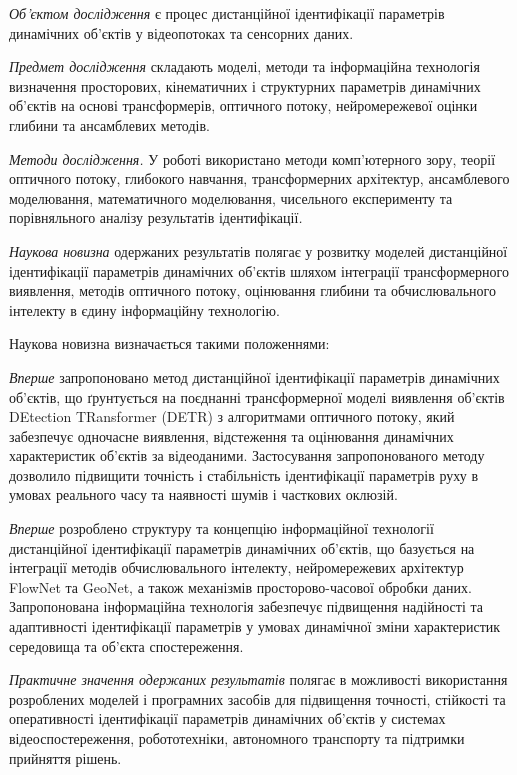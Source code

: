 \documentclass[
]{article}
\begin{document}
\emph{Об'єктом дослідження} є процес дистанційної ідентифікації параметрів динамічних об'єктів у відеопотоках та сенсорних даних.

\emph{Предмет дослідження} складають моделі, методи та інформаційна технологія визначення просторових, кінематичних і структурних параметрів динамічних об'єктів на основі трансформерів, оптичного потоку, нейромережевої оцінки глибини та ансамблевих методів.

\emph{Методи дослідження.} У роботі використано методи комп'ютерного зору, теорії оптичного потоку, глибокого навчання, трансформерних архітектур, ансамблевого моделювання, математичного моделювання, чисельного експерименту та порівняльного аналізу результатів ідентифікації\emph{.}

\emph{Наукова новизна} одержаних результатів полягає у розвитку моделей дистанційної ідентифікації параметрів динамічних об'єктів шляхом інтеграції трансформерного виявлення, методів оптичного потоку, оцінювання глибини та обчислювального інтелекту в єдину інформаційну технологію.

Наукова новизна визначається такими положеннями:

\emph{Вперше} запропоновано метод дистанційної ідентифікації параметрів динамічних об'єктів, що ґрунтується на поєднанні трансформерної моделі виявлення об'єктів DEtection TRansformer (DETR) з алгоритмами оптичного потоку, який забезпечує одночасне виявлення, відстеження та оцінювання динамічних характеристик об'єктів за відеоданими. Застосування запропонованого методу дозволило підвищити точність і стабільність ідентифікації параметрів руху в умовах реального часу та наявності шумів і часткових оклюзій.

\emph{Вперше} розроблено структуру та концепцію інформаційної технології дистанційної ідентифікації параметрів динамічних об'єктів, що базується на інтеграції методів обчислювального інтелекту, нейромережевих архітектур FlowNet та GeoNet, а також механізмів просторово-часової обробки даних. Запропонована інформаційна технологія забезпечує підвищення надійності та адаптивності ідентифікації параметрів у умовах динамічної зміни характеристик середовища та об'єкта спостереження.

\emph{Практичне значення одержаних результатів} полягає в можливості використання розроблених моделей і програмних засобів для підвищення точності, стійкості та оперативності ідентифікації параметрів динамічних об'єктів у системах відеоспостереження, робототехніки, автономного транспорту та підтримки прийняття рішень.
\end{document}
